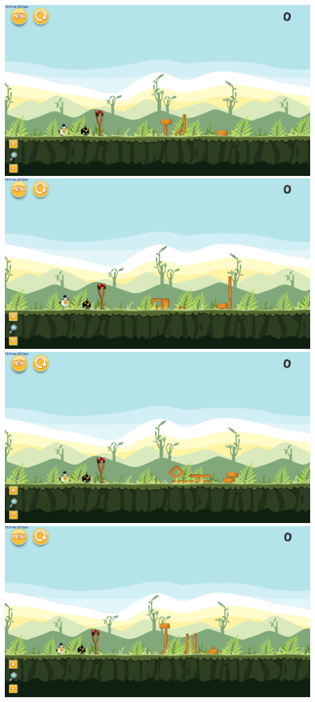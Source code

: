 \includegraphics[scale=0.3]{gfx/e1/level-0-180522_171359.png}
\includegraphics[scale=0.3]{gfx/e1/level-0-180522_183913.png}
\includegraphics[scale=0.3]{gfx/e1/level-0-180523_194214.png}
\includegraphics[scale=0.3]{gfx/e1/level-0-180523_203106.png}

